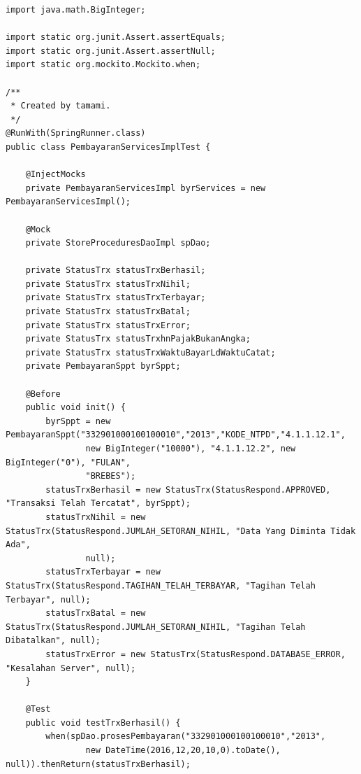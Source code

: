 \documentclass[pdftex,12pt, oneside]{article}
\begin{document}
\begin{enumerate}[A.]
\begin{enumerate}[1.]
\begin{lstlisting}
import java.math.BigInteger;

import static org.junit.Assert.assertEquals;
import static org.junit.Assert.assertNull;
import static org.mockito.Mockito.when;

/**
 * Created by tamami.
 */
@RunWith(SpringRunner.class)
public class PembayaranServicesImplTest {

    @InjectMocks
    private PembayaranServicesImpl byrServices = new PembayaranServicesImpl();

    @Mock
    private StoreProceduresDaoImpl spDao;

    private StatusTrx statusTrxBerhasil;
    private StatusTrx statusTrxNihil;
    private StatusTrx statusTrxTerbayar;
    private StatusTrx statusTrxBatal;
    private StatusTrx statusTrxError;
    private StatusTrx statusTrxhnPajakBukanAngka;
    private StatusTrx statusTrxWaktuBayarLdWaktuCatat;
    private PembayaranSppt byrSppt;

    @Before
    public void init() {
        byrSppt = new PembayaranSppt("332901000100100010","2013","KODE_NTPD","4.1.1.12.1",
                new BigInteger("10000"), "4.1.1.12.2", new BigInteger("0"), "FULAN",
                "BREBES");
        statusTrxBerhasil = new StatusTrx(StatusRespond.APPROVED, "Transaksi Telah Tercatat", byrSppt);
        statusTrxNihil = new StatusTrx(StatusRespond.JUMLAH_SETORAN_NIHIL, "Data Yang Diminta Tidak Ada",
                null);
        statusTrxTerbayar = new StatusTrx(StatusRespond.TAGIHAN_TELAH_TERBAYAR, "Tagihan Telah Terbayar", null);
        statusTrxBatal = new StatusTrx(StatusRespond.JUMLAH_SETORAN_NIHIL, "Tagihan Telah Dibatalkan", null);
        statusTrxError = new StatusTrx(StatusRespond.DATABASE_ERROR, "Kesalahan Server", null);
    }

    @Test
    public void testTrxBerhasil() {
        when(spDao.prosesPembayaran("332901000100100010","2013",
                new DateTime(2016,12,20,10,0).toDate(), null)).thenReturn(statusTrxBerhasil);


\end{lstlisting}
\end{enumerate}
\end{enumerate}
\end{document}
